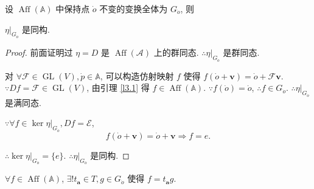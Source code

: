 \documentclass{ctexart}
\begin{document}
设 $\operatorname{Aff}(\mathbb{A})$ 中保持点 $\dot{o}$ 不变的变换全体为 $G_{\dot{o}}$, 则
\begin{lemma}\label{l3.3}
    $\eta|_{G_{\dot{o}}}$ 是同构.
\end{lemma}
\begin{proof}
    前面证明过 $\eta=D$ 是 $\operatorname{Aff}(\mathcal{A})$ 上的群同态. $\therefore\eta|_{G_{\dot{o}}}$ 是群同态.

    对 $\forall\mathcal{F}\in\operatorname{GL}(V),\dot{p}\in\mathbb{A}$, 可以构造仿射映射 $f$ 使得 $f(\dot{o}+\boldsymbol{v})=\dot{o}+\mathcal{F}\boldsymbol{v}$. $\because Df=\mathcal{F}\in\operatorname{GL}(V)$, 由引理 \ref{l3.1} 得 $f\in\operatorname{Aff}(\mathbb{A})$. $\because f(\dot{o})=\dot{o}$, $\therefore f\in G_{\dot{o}}$. $\therefore \eta|_{G_{\dot{o}}}$ 是满同态.
    
    $\because\forall f\in\ker\eta|_{G_{\dot{o}}},Df=\mathcal{E}$,
    \[f(\dot{o}+\boldsymbol{v})=\dot{o}+\boldsymbol{v}\Rightarrow f=e.\]

    $\therefore\ker\eta|_{G_{\dot{o}}}=\{e\}$. $\therefore\eta|_{G_{\dot{o}}}$ 是同构.
\end{proof}
\begin{theorem}\label{t3.1}
    $\forall f\in\operatorname{Aff}(\mathbb{A})$, $\exists!t_{\boldsymbol{a}}\in T,g\in G_{\dot{o}}$ 使得 $f=t_{\boldsymbol{a}}g$.
\end{theorem}
\end{document}

